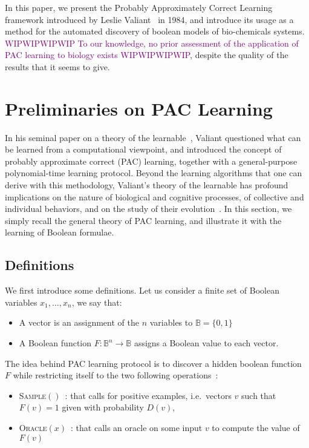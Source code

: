 \documentclass{llncs}
\newcommand{\wip}[1]{\textcolor{Purple}{WIPWIPWIPWIP #1 WIPWIPWIPWIP}}
\begin{document}
In this paper, we present the Probably Approximately Correct Learning framework introduced by Leslie Valiant~\cite{Valiant84cacm} in 1984, and introduce its usage as a method for the automated discovery of boolean models of bio-chemicals systems. \wip{To our knowledge, no prior assessment of the application of PAC learning to biology exists}, despite the quality of the results that it seems to give.

\section{Preliminaries on PAC Learning}\label{pac}

In his seminal paper on a theory of the learnable~\cite{Valiant84cacm},
Valiant questioned what can be learned from a computational viewpoint,
and introduced the concept of probably approximate correct (PAC) learning,
together with a general-purpose polynomial-time learning protocol.
Beyond the learning algorithms that one can derive with this methodology,
Valiant's theory of the learnable has profound implications
on the nature of biological and cognitive processes,
of collective and individual behaviors,
and on the study of their evolution~\cite{Valiant13book}.
In this section, we simply recall the general theory of PAC learning,
and illustrate it with the learning of Boolean formulae.

\subsection{Definitions}

We first introduce some definitions.
Let us consider a finite set of Boolean variables $x_1,\ldots,x_n$, we say that:
\begin{itemize}
	\item A vector is an assignment of the $n$ variables to $\mathbb{B} = \{0,1\}$
	\item A Boolean function $F:{\mathbb{B}}^n \rightarrow \mathbb{B}$
	assigns a Boolean value to each vector.
\end{itemize}

The idea behind PAC learning protocol is to discover a hidden boolean function $F$ while restricting itself to the two following operations~:
\begin{itemize}
  \item
\textsc{Sample}$()$~: that calls for positive examples, i.e.~vectors $v$ such that $F(v)=1$ given with probability $D(v)$,
  \item
\textsc{Oracle}$(x)$~: that calls an oracle on some input $v$ to compute the value of $F(v)$
\end{itemize}
\end{document}
